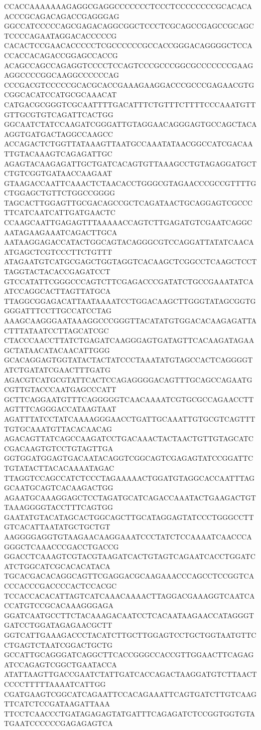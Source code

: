 CCACCAAAAAAAGAGGCGAGGCCCCCCCTCCCTCCCCCCCCGCACACAACCCGCAGACAGACCGAGGGAG
GGCCATCCCCCAGCGAGACAGGCGGCTCCCTCGCAGCCGAGCCGCAGCTCCCCAGAATAGGACACCCCCG
CACACTCCGAACACCCCCTCGCCCCCCGCCACCGGGACAGGGGCTCCACCACCACAGACCGGAGCCACCG
ACAGCCAGCCAGAGGTCCCCTCCAGTCCCGCCCGGCGCCCCCCCGAAGAGGCCCCGGCAAGGCCCCCCAG
CCCGACGTCCCCCGCACGCACCGAAAGAAGGACCCGCCCGAGAACGTGCGGCACATCCATGCGCAAACAT
CATGACGCGGGTCGCAATTTTGACATTTCTGTTTCTTTTCCCAAATGTTGTTGCGTGTCAGATTCACTGG
GGCAATCTATCCAAGATCGGGATTGTAGGAACAGGGAGTGCCAGCTACAAGGTGATGACTAGGCCAAGCC
ACCAGACTCTGGTTATAAAGTTAATGCCAAATATAACGGCCATCGACAATTGTACAAAGTCAGAGATTGC
AGAGTACAAGAGATTGCTGATCACAGTGTTAAAGCCTGTAGAGGATGCTCTGTCGGTGATAACCAAGAAT
GTAAGACCAATTCAAACTCTAACACCTGGGCGTAGAACCCGCCGTTTTGCTGGAGCTGTTCTGGCCGGGG
TAGCACTTGGAGTTGCGACAGCCGCTCAGATAACTGCAGGAGTCGCCCTTCATCAATCATTGATGAACTC
CCAAGCAATTGAGAGTTTAAAAACCAGTCTTGAGATGTCGAATCAGGCAATAGAAGAAATCAGACTTGCA
AATAAGGAGACCATACTGGCAGTACAGGGCGTCCAGGATTATATCAACAATGAGCTCGTCCCTTCTGTTT
ATAGAATGTCATGCGAGCTGGTAGGTCACAAGCTCGGCCTCAAGCTCCTTAGGTACTACACCGAGATCCT
GTCCATATTCGGGCCCAGTCTTCGAGACCCGATATCTGCCGAAATATCAATCCAGGCACTTAGTTATGCA
TTAGGCGGAGACATTAATAAAATCCTGGACAAGCTTGGGTATAGCGGTGGGGATTTCCTTGCCATCCTAG
AAAGCAAGGGAATAAAGGCCCGGGTTACATATGTGGACACAAGAGATTACTTTATAATCCTTAGCATCGC
CTACCCAACCTTATCTGAGATCAAGGGAGTGATAGTTCACAAGATAGAAGCTATAACATACAACATTGGG
GCACAGGAGTGGTATACTACTATCCCTAAATATGTAGCCACTCAGGGGTATCTGATATCGAACTTTGATG
AGACGTCATGCGTATTCACTCCAGAGGGGACAGTTTGCAGCCAGAATGCGTTGTACCCAATGAGCCCATT
GCTTCAGGAATGTTTCAGGGGGTCAACAAAATCGTGCGCCAGAACCTTAGTTTCAGGGACCATAAGTAAT
AGATTTATCCTATCAAAAGGGAACCTGATTGCAAATTGTGCGTCAGTTTTGTGCAAATGTTACACAACAG
AGACAGTTATCAGCCAAGATCCTGACAAACTACTAACTGTTGTAGCATCCGACAAGTGTCCTGTAGTTGA
GGTGGATGGAGTGACAATACAGGTCGGCAGTCGAGAGTATCCGGATTCTGTATACTTACACAAAATAGAC
TTAGGTCCAGCCATCTCCCTAGAAAAACTGGATGTAGGCACCAATTTAGGCAATGCAGTCACAAGACTGG
AGAATGCAAAGGAGCTCCTAGATGCATCAGACCAAATACTGAAGACTGTTAAAGGGGTACCTTTCAGTGG
GAATATGTACATAGCACTGGCAGCTTGCATAGGAGTATCCCTGGGCCTTGTCACATTAATATGCTGCTGT
AAGGGGAGGTGTAAGAACAAGGAAATCCCTATCTCCAAAATCAACCCAGGGCTCAAACCCGACCTGACCG
GGACCTCAAAGTCGTACGTAAGATCACTGTAGTCAGAATCACCTGGATCATCTGGCATCGCACACATACA
TGCACGACACAGGCAGTTCGAGGACGCAAGAAACCCAGCCTCCGGTCACCCACCCGACCCCACTCCACGC
TCCACCACACATTAGTCATCAAACAAAACTTAGGACGAAAGGTCAATCACCATGTCCGCACAAAGGGAGA
GGATCAATGCCTTCTACAAAGACAATCCTCACAATAAGAACCATAGGGTGATCCTGGATAGAGAACGCTT
GGTCATTGAAAGACCCTACATCTTGCTTGGAGTCCTGCTGGTAATGTTCCTGAGTCTAATCGGACTGCTG
GCCATTGCAGGGATCAGGCTTCACCGGGCCACCGTTGGAACTTCAGAGATCCAGAGTCGGCTGAATACCA
ATATTAAGTTGACCGAATCTATTGATCACCAGACTAAGGATGTCTTAACTCCCCTTTTTAAAATCATTGG
CGATGAAGTCGGCATCAGAATTCCACAGAAATTCAGTGATCTTGTCAAGTTCATCTCCGATAAGATTAAA
TTCCTCAACCCTGATAGAGAGTATGATTTCAGAGATCTCCGGTGGTGTATGAATCCCCCCGAGAGAGTCA
